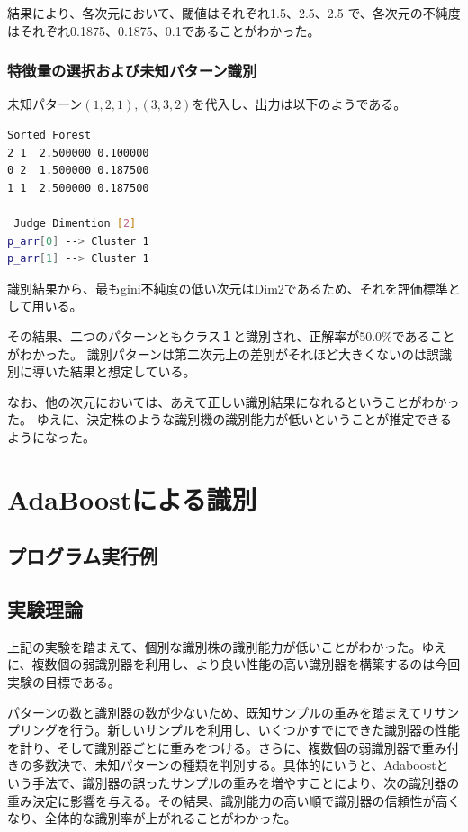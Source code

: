 \documentclass[ %
  uplatex,%
  papersize%
]{jsarticle}
\begin{document}
結果により、各次元において、閾値はそれぞれ1.5、2.5、2.5 で、各次元の不純度はそれぞれ0.1875、0.1875、0.1であることがわかった。

\subsubsection{特徴量の選択および未知パターン識別}
未知パターン$(1, 2, 1),(3, 3, 2)$を代入し、出力は以下のようである。

\begin{lstlisting}[language=bash,caption=Recognition]
Sorted Forest
2 1  2.500000 0.100000
0 2  1.500000 0.187500
1 1  2.500000 0.187500

 Judge Dimention [2]
p_arr[0] --> Cluster 1
p_arr[1] --> Cluster 1
\end{lstlisting}

識別結果から、最もgini不純度の低い次元はDim2であるため、それを評価標準として用いる。

その結果、二つのパターンともクラス１と識別され、正解率が50.0\%であることがわかった。
識別パターンは第二次元上の差別がそれほど大きくないのは誤識別に導いた結果と想定している。

なお、他の次元においては、あえて正しい識別結果になれるということがわかった。
ゆえに、決定株のような識別機の識別能力が低いということが推定できるようになった。

\section{AdaBoostによる識別}

\subsection{プログラム実行例}

\subsection{実験理論}

上記の実験を踏まえて、個別な識別株の識別能力が低いことがわかった。ゆえに、複数個の弱識別器を利用し、より良い性能の高い識別器を構築するのは今回実験の目標である。

パターンの数と識別器の数が少ないため、既知サンプルの重みを踏まえてリサンプリングを行う。新しいサンプルを利用し、いくつかすでにできた識別器の性能を計り、そして識別器ごとに重みをつける。さらに、複数個の弱識別器で重み付きの多数決で、未知パターンの種類を判別する。具体的にいうと、Adaboostという手法で、識別器の誤ったサンプルの重みを増やすことにより、次の識別器の重み決定に影響を与える。その結果、識別能力の高い順で識別器の信頼性が高くなり、全体的な識別率が上がれることがわかった。
\end{document}

